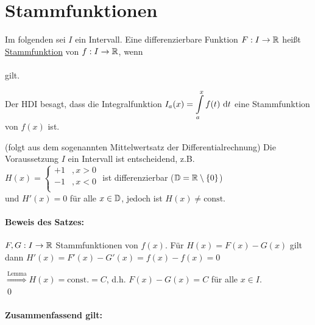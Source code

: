 \clearpage
\section{Stammfunktionen}
Im folgenden sei $I$ ein Intervall.
\Def Eine differenzierbare Funktion $F:I\to\mathbb{R}$ heißt \ul{Stammfunktion} von $f:I\to\mathbb{R}$, wenn\\ \\ gilt.

\Bem Der HDI besagt, dass die Integralfunktion $I_a(x)=\displaystyle\int\limits_{a}^{x}f(t)\ \mathrm{d}t$ eine Stammfunktion von $f(x)$ ist.


(folgt aus dem sogenannten Mittelwertsatz der Differentialrechnung)
\Beachte Die Voraussetzung {\flqq $I$ ein Intervall\frqq} ist entscheidend, z.B.\\
$H(x)=\left\{\begin{array}{ll}+1&,x>0\\-1&,x<0\\\end{array}\right.$ ist differenzierbar ($\mathbb{D}=\mathbb{R}\setminus\{0\}$)\\
und $H'(x)=0$ für alle $x\in\mathbb{D}$, jedoch ist $H(x)\ne\text{const.}$

\paragraph{Beweis des Satzes:} $F,G:I\to\mathbb{R}$ Stammfunktionen von $f(x)$. Für $H(x)=F(x)-G(x)$ gilt dann $H'(x)=F'(x)-G'(x)=f(x)-f(x)=0$

$\stackrel{\text{Lemma}}{\Longrightarrow}H(x)=\text{const.}=C$, d.h. $F(x)-G(x)=C$ für alle $x\in I$.\\
\qed %

\paragraph{Zusammenfassend gilt:}\quad\\

